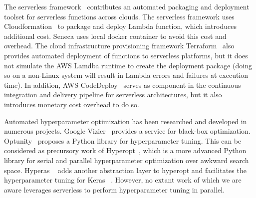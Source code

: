 The serverless framework~\cite{ref:serverless_framework} contributes an 
automated packaging and deployment toolset for serverless functions across clouds. 
The serverless framework uses Cloudformation~\cite{ref:cloudformation} to package and deploy Lambda function, which introduces additional cost. Seneca uses local docker container to avoid this cost
and overhead. The cloud infrastructure provisioning framework Terraform~\cite{ref:terraform} 
also provides automated deployment of functions to serverless platforms, but it does not simulate the AWS Lamdba runtime to create the deployment package (doing so on a non-Linux system will result in Lambda errors and failures at execution time). 
In addition, AWS CodeDeploy~\cite{ref:codedeploy} serves as component in the continuous integration and delivery pipeline for serverless architectures, but it also introduces monetary cost overhead
to do so.

Automated hyperparameter optimization has been researched and developed 
in numerous projects. Google Vizier~\cite{ref:vizier} provides a service for 
black-box optimization. Optunity~\cite{ref:claesen2014hyperparameter} 
proposes a Python library for hyperparameter tuning. 
This can be considered as precursory work of Hyperopt~\cite{ref:hyperopt}, 
which is a more advanced Python library for serial and parallel hyperparameter 
optimization over awkward search space. Hyperas ~\cite{ref:hyperas} adds another 
abstraction layer to hyperopt and facilitates the hyperparameter tuning for 
Keras ~\cite{ref:keras}. However, no extant work of which we are aware leverages
serverless to perform hyperparameter tuning in parallel. 
